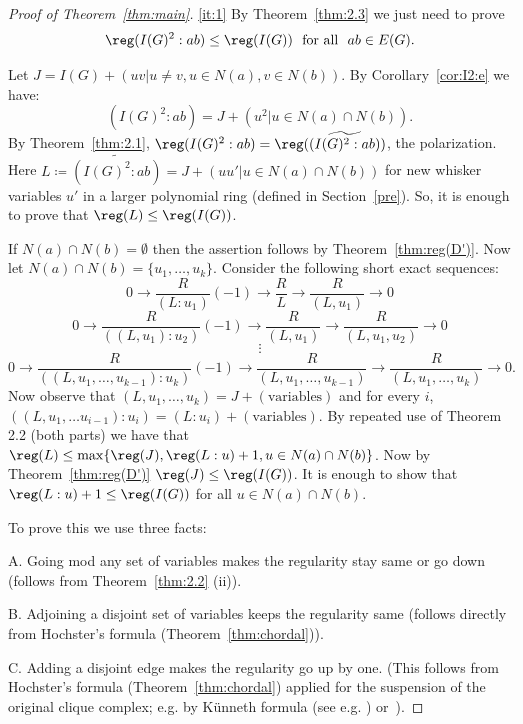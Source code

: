 



\begin{proof}[Proof of Theorem~\ref{thm:main}]
\ref{it:1} By Theorem~\ref{thm:2.3} we just need to prove
\begin{equation}\label{eq:I(G)^2:ab}
\reg(I(G)^2:ab)\leq \reg(I(G))\ \ {\rm for\  all\ \ } ab \in E(G).
\end{equation}

Let $J=I(G) +(uv|u\neq v, u \in N(a),v\in N(b))$. By Corollary~\ref{cor:I2:e}
we have:$$(I(G)^2:ab)=J+(u^2| u \in N(a) \cap N(b)).$$
By Theorem~\ref{thm:2.1}, $\reg(I(G)^2:ab)  = \reg(\widetilde{(I(G)^2:ab)})$, the polarization. Here $L\coloneqq\widetilde{(I(G)^2:ab)}=
J+(uu'| u \in N(a) \cap N(b))$
for new whisker variables $u'$
 in a larger polynomial ring (defined in Section~\ref{pre}).
So, it is enough to prove that $\reg(L) \leq \reg(I(G))$.


 If $N(a) \cap N(b)=\emptyset$ then the assertion follows by Theorem~\ref{thm:reg(D')}. Now let $N(a) \cap N(b)=\{u_1, \ldots, u_k\}$. Consider the following short exact sequences:
$$0 \longrightarrow \frac{R}{(L:u_1)} (-1) \rightarrow \frac{R}{L} \rightarrow \frac{R}{(L,u_1)} \rightarrow 0$$
$$0 \longrightarrow \frac{R}{((L, u_1):u_2)} (-1) \rightarrow \frac{R}{(L, u_1)} \rightarrow \frac{R}{(L,u_1,u_2)} \rightarrow 0$$
$$\vdots$$
$$0 \longrightarrow \frac{R}{((L,u_1,\ldots ,u_{k-1}):u_k)} (-1) \rightarrow \frac{R}{(L, u_1, \ldots , u_{k-1})} \rightarrow \frac{R}{(L,u_1,\ldots ,u_k)} \rightarrow 0.$$
  Now observe that $(L,u_1,\ldots ,u_k)=J+(\text{variables})$ and for every $i$,  $((L,u_1,\ldots u_{i-1}):u_i)=(L:u_i)+ (\text{variables})$. By repeated use of Theorem 2.2 (both parts) we have that $\reg (L) \leq \max \{ \reg (J), \reg(L:u)+1, u\in N(a) \cap N(b)\}$. Now by Theorem~\ref{thm:reg(D')} $\reg(J) \leq \reg(I(G))$. It is enough to show that $ \reg(L:u)+1 \leq \reg(I(G))$ for all $u \in N(a) \cap N(b)$.

 To prove this we use three facts:

 A. Going mod any set of variables  makes the regularity stay same or go down (follows from Theorem~\ref{thm:2.2} (ii)).

 B. Adjoining a disjoint set of variables keeps the regularity same  (follows directly from Hochster's formula (Theorem~\ref{thm:chordal})).

 C. Adding a disjoint edge makes the regularity go up by one. (This follows from Hochster's formula (Theorem~\ref{thm:chordal}) applied for the suspension of the original clique complex; e.g. by K\"unneth formula (see e.g. \cite[9.12]{ABJ}) or~\cite[Lemma.8]{russ}).


\end{proof}
